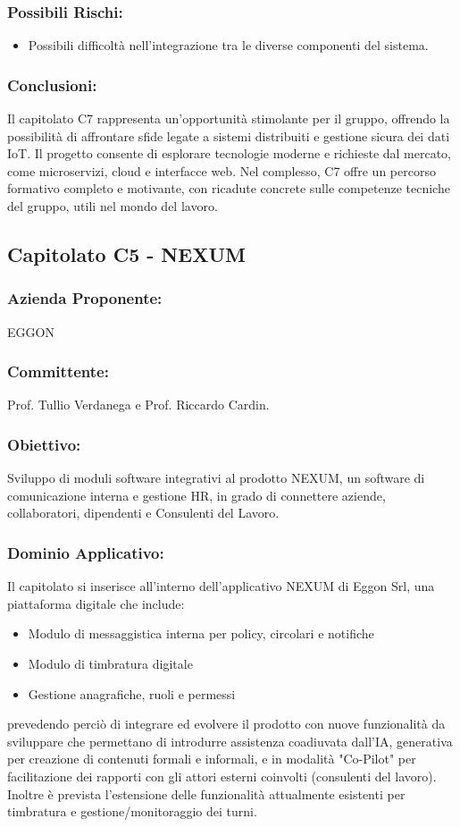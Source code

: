 \documentclass[a4paper,12pt]{article}
\begin{document}
\subsubsection*{Possibili Rischi:}
\begin{itemize}
    \item Possibili difficoltà nell'integrazione tra le diverse componenti del sistema.
\end{itemize}

\subsubsection*{Conclusioni:}
Il capitolato C7 rappresenta un’opportunità stimolante per il gruppo, offrendo la possibilità di affrontare sfide legate a sistemi distribuiti e gestione sicura dei dati IoT.
Il progetto consente di esplorare tecnologie moderne e richieste dal mercato, come microservizi, cloud e interfacce web. Nel complesso, C7 offre un percorso formativo completo e motivante, con ricadute concrete sulle competenze tecniche del gruppo, utili nel mondo del lavoro.

\subsection{ Capitolato C5 - NEXUM}
\subsubsection*{Azienda Proponente:} EGGON
\subsubsection*{Committente:} Prof. Tullio Verdanega e Prof. Riccardo Cardin.
\subsubsection*{Obiettivo:}
Sviluppo di moduli software integrativi al prodotto NEXUM, un software di comunicazione interna e gestione HR, in grado di connettere aziende, collaboratori, dipendenti e Consulenti del Lavoro.
\subsubsection*{Dominio Applicativo:}
Il capitolato si inserisce all'interno dell'applicativo NEXUM di Eggon Srl, una piattaforma digitale che include:
\begin{itemize}
    \item Modulo di messaggistica interna per policy, circolari e notifiche
    \item Modulo di timbratura digitale
    \item Gestione anagrafiche, ruoli e permessi
\end{itemize}
prevedendo perciò di integrare ed evolvere il prodotto con nuove funzionalità da sviluppare che permettano di introdurre assistenza coadiuvata dall'IA, generativa per creazione di contenuti formali e informali, e in modalità "Co-Pilot" per facilitazione dei rapporti con gli attori esterni coinvolti (consulenti del lavoro). Inoltre è prevista l'estensione delle funzionalità attualmente esistenti per timbratura e gestione/monitoraggio dei turni.
 
\end{document}
